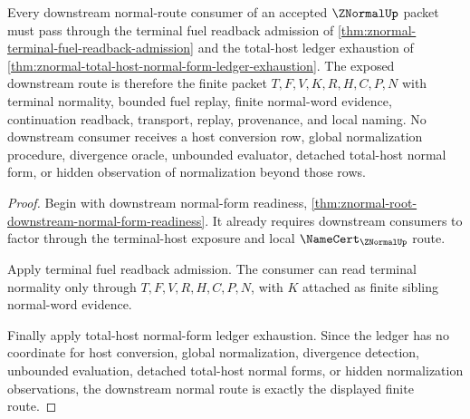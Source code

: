 \begin{theorem}
\label{thm:znormal-downstream-normal-route-boundary}
Every downstream normal-route consumer of an accepted $\ZNormalUp$ packet must pass through the terminal fuel readback admission of \autoref{thm:znormal-terminal-fuel-readback-admission} and the total-host ledger exhaustion of \autoref{thm:znormal-total-host-normal-form-ledger-exhaustion}. The exposed downstream route is therefore the finite packet $T,F,V,K,R,H,C,P,N$ with terminal normality, bounded fuel replay, finite normal-word evidence, continuation readback, transport, replay, provenance, and local naming. No downstream consumer receives a host conversion row, global normalization procedure, divergence oracle, unbounded evaluator, detached total-host normal form, or hidden observation of normalization beyond those rows.
\end{theorem}
\begin{proof}
Begin with downstream normal-form readiness, \autoref{thm:znormal-root-downstream-normal-form-readiness}. It already requires downstream consumers to factor through the terminal-host exposure and local $\NameCert_{\ZNormalUp}$ route.

Apply terminal fuel readback admission. The consumer can read terminal normality only through $T,F,V,R,H,C,P,N$, with $K$ attached as finite sibling normal-word evidence.

Finally apply total-host normal-form ledger exhaustion. Since the ledger has no coordinate for host conversion, global normalization, divergence detection, unbounded evaluation, detached total-host normal forms, or hidden normalization observations, the downstream normal route is exactly the displayed finite route.
\end{proof}

